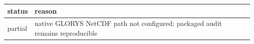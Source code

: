 \begin{tabular}{ll}
\toprule
status & reason \\
\midrule
partial & native GLORYS NetCDF path not configured; packaged audit remains reproducible \\
\bottomrule
\end{tabular}
